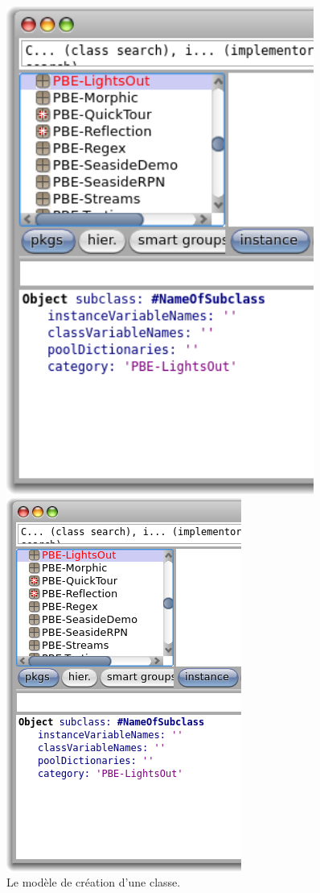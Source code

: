 \documentclass[a4paper,10pt,twoside]{book}
\begin{document}
\begin{figure}[htb]
\begin{minipage}[b]{0.48\textwidth}
	{\centerline {\includegraphics[width=0.9\textwidth]{ClassTemplate}}}
	{\centerline {\includegraphics[scale=0.7]{ClassTemplate}}}
	\caption{Le modèle de création d'une classe.
	\label{fig:classTemplate}}
\end{minipage}
\end{figure}
\end{document}

